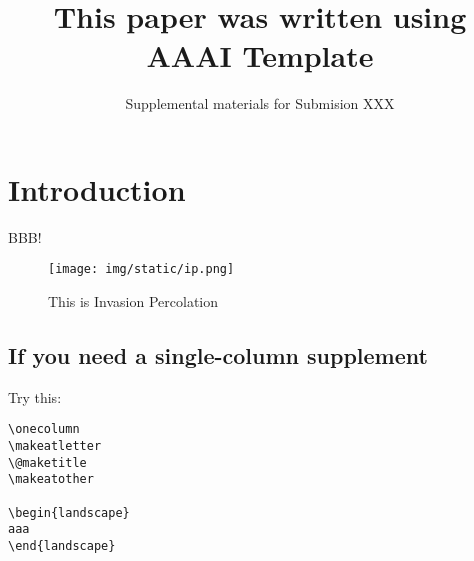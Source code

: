 

\renewcommand{\thesection}{S\arabic{section}}
\renewcommand{\thetable}{S\arabic{table}}
\renewcommand{\thefigure}{S\arabic{figure}}

\pagestyle{empty}

\author{Supplemental materials for Submision XXX}
\title{This paper was written using AAAI Template}

\maketitle

\section{Introduction}

BBB!  \cite{Asai2016}

\begin{figure}[tb]
 \texttt{[image: img/static/ip.png]}
 \caption{This is Invasion Percolation}
 \label{fig:ip-supplement}
\end{figure}

\subsection{If you need a single-column supplement}

Try this:

\begin{verbatim}
\onecolumn
\makeatletter
\@maketitle
\makeatother

\begin{landscape}
aaa
\end{landscape}
\end{verbatim}

\fontsize{9.5pt}{10.5pt}
\selectfont
 



